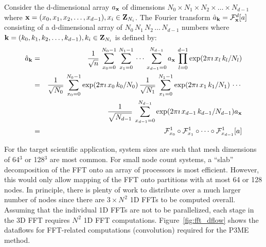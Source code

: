 \documentclass[pdftex,finalversion,simpleeqnnos,titlepage,12pt]{article}
\newcommand{\Z}{\ensuremath{\mathbf{Z}}}
\newcommand{\meshsize}[1]{\ensuremath{N_{#1}}}
\begin{document}
Consider the d-dimensional array $a_{\bf x}$ of dimensions $N_0\times
N_1\times N_2\times\ldots\times N_{d-1}$ where ${\bf x} =
(x_0,x_1,x_2,\ldots,x_{d-1}), x_i \in \Z_{N_{i}}$.  The Fourier
transform $\hat{a}_{\bf k} = \mathcal{F}_{\bf x}^d[a]$ consisting of a d-dimensional array of
$N_0\,N_1\,N_2\,\ldots\,N_{d-1}$ numbers where  ${\bf k} =
(k_0,k_1,k_2,\ldots,k_{d-1}), k_i \in \Z_{N_{i}}$ is defined by:
\begin{eqnarray}
\hat{a}_{\bf k} & = &
\frac{1}{\sqrt{n}}\,\sum_{x_0=0}^{N_0-1}\,\sum_{x_1=0}^{N_1-1}\,\cdots\,\sum_{x_{d-1}=0}^{N_{d-1}}a_{\bf
  x}\,\prod_{l=0}^{d-1}\exp(2\pi\imath\,x_l\,k_l/N_l) \\
          & = &
\frac{1}{\sqrt{N_0}}\,\sum_{x_0=0}^{N_0-1}\exp(2\pi\imath\,x_0\,k_0/N_0)\,
\frac{1}{\sqrt{N_1}}\,\sum_{x_1=0}^{N_1-1}\exp(2\pi\imath\,x_1\,k_1/N_1)\,
\cdots\,\nonumber \\
& & \mbox{} \frac{1}{\sqrt{N_{d-1}}}\,\sum_{x_{d-1}=0}^{N_{d-1}}\exp(2\pi\imath\,x_{d-1}\,k_{d-1}/N_{d-1})a_{\bf
  x} \nonumber \\
& = & \mathcal{F}_{x_0}^{1}\circ\mathcal{F}_{x_1}^{1}\circ\cdots
\circ\mathcal{F}_{x_{d-1}}^{1}[a] \nonumber
\end{eqnarray}

For the target scientific application, system sizes are such that mesh
dimensions of 64$^3$ or 128$^3$ are most common.  For small node count
systems, a ``slab'' decomposition of the FFT onto an array of
processors is most efficient.  However, this would only allow mapping
of the FFT onto partitions with at most 64 or 128 nodes.  In
principle, there is plenty of work to distribute over a much larger
number of nodes since there are $3\times\meshsize{}^2$ 1D FFTs to be
computed overall.  Assuming that the individual 1D FFTs are not to be
parallelized, each stage in the 3D FFT requires $\meshsize{}^2$ 1D FFT
computations.  Figure~\ref{fig:fft_dflow} shows the dataflows for
FFT-related computations (convolution) required for the P3ME method.
\end{document}
